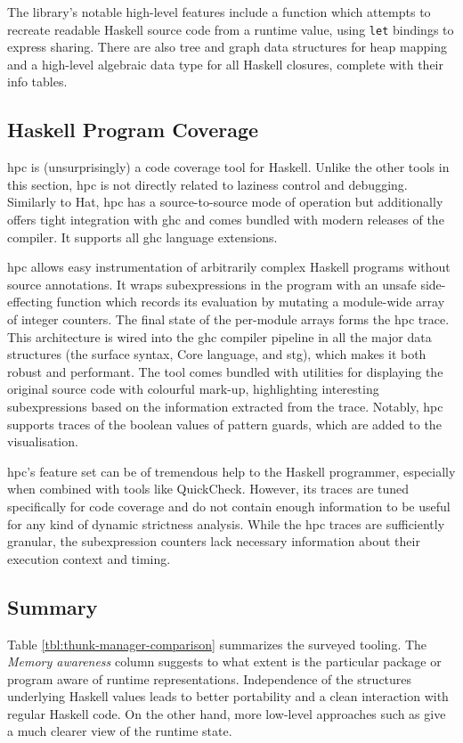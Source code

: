 \documentclass[thesis=B,english]{FITthesis}[2019/12/23]
\newcommand{\hsCode}[1]{\texttt{#1}}
\begin{document}
The library's notable high-level features include a function which attempts to
recreate readable Haskell source code from a runtime value, using \hsCode{let}
bindings to express sharing. There are also tree and graph data structures for
heap mapping and a high-level algebraic data type for all Haskell closures,
complete with their info tables.


\subsection*{Haskell Program Coverage} \label{sec:hpc}
\acrlong{hpc}\cite{hpc-paper} is (unsurprisingly) a code coverage tool for
Haskell. Unlike the other tools in this section, \acrshort{hpc} is not directly
related to laziness control and debugging. Similarly to Hat, \acrshort{hpc} has
a source-to-source mode of operation but additionally offers tight integration
with \acrshort{ghc} and comes bundled with modern releases of the compiler. It
supports all \acrshort{ghc} language extensions.

\acrshort{hpc} allows easy instrumentation of arbitrarily complex Haskell
programs without source annotations. It wraps subexpressions in the program
with an unsafe side-effecting function which records its evaluation by mutating
a module-wide array of integer counters. The final state of the per-module
arrays forms the \acrshort{hpc} trace. This architecture is wired into the
\acrshort{ghc} compiler pipeline in all the major data structures (the surface
syntax, Core language, and \acrshort{stg}), which makes it both robust and
per\-for\-mant. The tool comes bundled with utilities for displaying the
original source code with colourful mark-up, highlighting interesting
subexpressions based on the information extracted from the trace. Notably,
\acrshort{hpc} supports traces of the boolean values of pattern guards, which
are added to the visualisation.

\acrshort{hpc}'s feature set can be of tremendous help to the Haskell
programmer, especially when combined with tools like
QuickCheck\cite{quickcheck-paper}. However, its traces are tuned specifically
for code coverage and do not contain enough information to be useful for any
kind of dynamic strictness analysis. While the \acrshort{hpc} traces are
sufficiently granular, the subexpression counters lack necessary information
about their execution context and timing.


\subsection*{Summary} \label{sec:summary}
Table \ref{tbl:thunk-manager-comparison} summarizes the surveyed tooling. The
\textit{Memory awareness} column suggests to what extent is the particular
package or program aware of runtime representations. Independence of the
structures underlying Haskell values leads to better portability and a clean
interaction with regular Haskell code. On the other hand, more low-level
approaches such as  give a much clearer view of the
runtime state.
\end{document}
